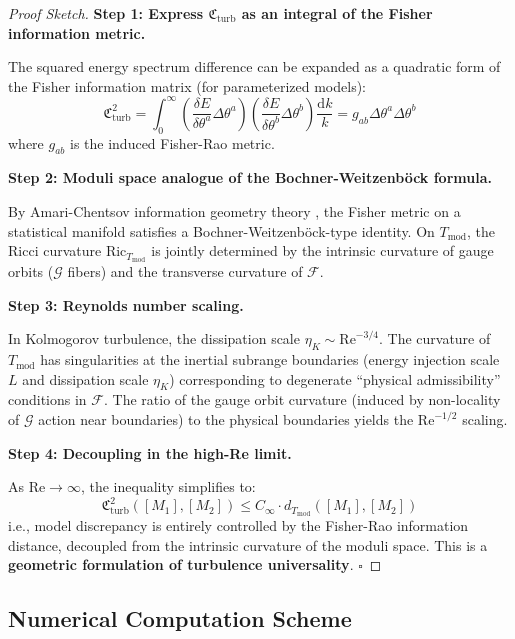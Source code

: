 \documentclass[12pt,a4paper]{article}
\theoremstyle{plain}
\theoremstyle{definition}
\theoremstyle{remark}
\newcommand{\F}{\mathcal{F}}
\newcommand{\G}{\mathcal{G}}
\newcommand{\cercis}{\mathfrak{C}}
\newcommand{\Tmod}{T_{\text{mod}}}
\newcommand{\ReNum}{\mathrm{Re}}
\newcommand{\diff}{\mathrm{d}}
\begin{document}
\begin{proof}[Proof Sketch]
\textbf{Step 1: Express $\cercis_{\text{turb}}$ as an integral of the Fisher information metric.}

The squared energy spectrum difference can be expanded as a quadratic form of the Fisher information matrix (for parameterized models):
\begin{equation}
\cercis_{\text{turb}}^2 = \int_0^\infty \left(\frac{\delta E}{\delta\theta^a}\Delta\theta^a\right)\left(\frac{\delta E}{\delta\theta^b}\Delta\theta^b\right)\frac{\diff k}{k} = g_{ab}\Delta\theta^a\Delta\theta^b
\end{equation}
where $g_{ab}$ is the induced Fisher-Rao metric.

\textbf{Step 2: Moduli space analogue of the Bochner-Weitzenb\"ock formula.}

By Amari-Chentsov information geometry theory \cite{amari2000}, the Fisher metric on a statistical manifold satisfies a Bochner-Weitzenb\"ock-type identity. On $\Tmod$, the Ricci curvature $\text{Ric}_{\Tmod}$ is jointly determined by the intrinsic curvature of gauge orbits ($\G$ fibers) and the transverse curvature of $\F$.

\textbf{Step 3: Reynolds number scaling.}

In Kolmogorov turbulence, the dissipation scale $\eta_K \sim \ReNum^{-3/4}$. The curvature of $\Tmod$ has singularities at the inertial subrange boundaries (energy injection scale $L$ and dissipation scale $\eta_K$) corresponding to degenerate ``physical admissibility'' conditions in $\F$. The ratio of the gauge orbit curvature (induced by non-locality of $\G$ action near boundaries) to the physical boundaries yields the $\ReNum^{-1/2}$ scaling.

\textbf{Step 4: Decoupling in the high-Re limit.}

As $\ReNum\to\infty$, the inequality simplifies to:
\begin{equation}
\cercis_{\text{turb}}^2([M_1], [M_2]) \leq C_\infty \cdot d_{\Tmod}([M_1], [M_2])
\end{equation}
i.e., model discrepancy is entirely controlled by the Fisher-Rao information distance, decoupled from the intrinsic curvature of the moduli space. This is a \textbf{geometric formulation of turbulence universality}. $\square$
\end{proof}

\subsection{Numerical Computation Scheme}
\end{document}
